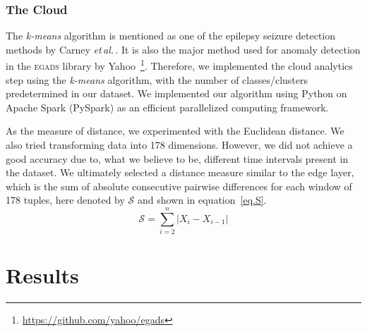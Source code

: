 \documentclass[letterpaper]{article}
\newcommand{\etal}{\emph{et\,al.}\,}
\begin{document}
\subsubsection{The Cloud}

The \emph{k-means} algorithm is mentioned as one of the epilepsy seizure detection methods by Carney \etal\cite{Carney2011}. It is also the major method used for anomaly detection in the \textsc{egads} library by Yahoo~\cite{egads}\footnote{\url{https://github.com/yahoo/egads}}. Therefore, we implemented the cloud analytics step using the \emph{k-means} algorithm, with the number of classes/clusters predetermined in our dataset. We implemented our algorithm using Python on Apache Spark (PySpark) as an efficient parallelized computing framework.

As the measure of distance, we experimented with the Euclidean distance. We also tried transforming data into 178 dimensions. However, we did not achieve a good accuracy due to, what we believe to be, different time intervals present in the dataset. We ultimately selected a distance measure similar to the edge layer, which is the sum of absolute consecutive pairwise differences for each window of 178 tuples, here denoted by \(\mathcal{S}\) and shown in equation~\ref{eq.S}.
\begin{equation}
  \label{eq.S}
  \mathcal{S} = \sum_{i=2}^{n}{\left|X_i - X_{i-1}\right|}
\end{equation}

\section{Results}
\end{document}
